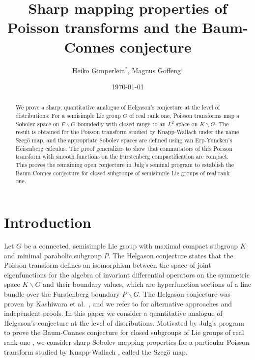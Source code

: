 \documentclass[a4paper,reqno]{amsart}
\numberwithin{equation}{section}
\theoremstyle{definition}
\theoremstyle{remark}
\begin{document}
\date{\today}

\title[Poisson transforms and the Baum-Connes conjecture]{Sharp mapping properties of Poisson transforms and the Baum-Connes conjecture}

\author{Heiko Gimperlein$^*$, Magnus Goffeng$^\dagger$}
\address[$^*$]{Engineering Mathematics, Universit\"{a}t Innsbruck, Technikerstraße 13, 6020 Innsbruck, Austria}
\address[$^\dagger$]{Centre for Mathematical Sciences, Lund University, Box 118, SE-221 00 Lund, Sweden}


\begin{abstract}
We prove a sharp, quantitative analogue of Helgason's conjecture at the level of distributions: For a semisimple Lie group $G$ of real rank one, Poisson transforms map a Sobolev space on $P\backslash G$ boundedly with closed range to an $L^2$-space on $K\backslash G$. The result is obtained for the Poisson transform studied by Knapp-Wallach under the name Szegö map, and the appropriate Sobolev spaces are defined using van Erp-Yuncken's Heisenberg calculus. The proof generalizes to show that commutators of this Poisson transform with smooth functions on the Furstenberg compactification are compact. This proves the remaining open conjecture in Julg's seminal program to establish the Baum-Connes conjecture for closed subgroups of semisimple Lie groups of real rank one.
\end{abstract}



\maketitle



\section{Introduction}



Let $G$ be a connected, semisimple Lie group with maximal compact subgroup $K$ and minimal parabolic subgroup $P$. The Helgason conjecture \cite{helgason70} states that the Poisson transform defines an isomorphism between the space of joint eigenfunctions for the algebra of invariant differential operators on the symmetric space $K\backslash G$ and their boundary values, which are hyperfunction sections of a line bundle over the Furstenberg boundary $P\backslash G$. The Helgason conjecture was proven by Kashiwara et al.~\cite{kashi78}, and we refer to \cite{gkks,ks94,schmidbvp} for alternative approaches and independent proofs. In this paper we consider a quantitative analogue of Helgason's conjecture at the level of distributions. Motivated by Julg's program to prove the Baum-Connes conjecture for closed subgroups of Lie groups of real rank one \cite{julghow}, we consider sharp Sobolev mapping properties for a particular Poisson transform studied by Knapp-Wallach \cite{knappwallach}, called the Szegö map. 
\end{document}
